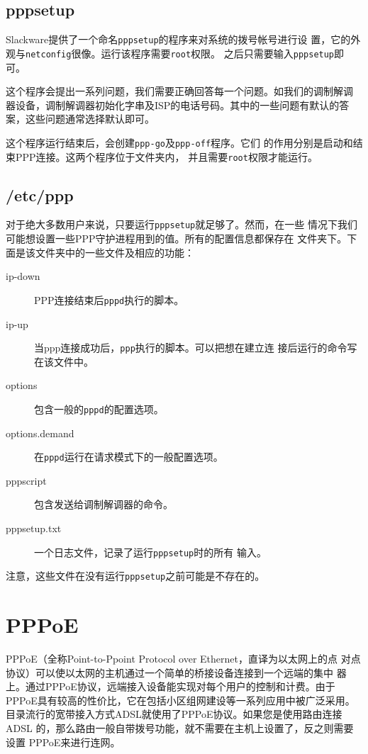 \subsection{pppsetup}
\label{sec:networkConfiguration:ppp:pppsetup}
Slackware提供了一个命名\texttt{pppsetup}的程序来对系统的拨号帐号进行设
置，它的外观与\texttt{netconfig}很像。运行该程序需要\texttt{root}权限。
之后只需要输入\texttt{pppsetup}即可。

这个程序会提出一系列问题，我们需要正确回答每一个问题。如我们的调制解调
器设备，调制解调器初始化字串及ISP的电话号码。其中的一些问题有默认的答
案，这些问题通常选择默认即可。

这个程序运行结束后，会创建\texttt{ppp-go}及\texttt{ppp-off}程序。它们
的作用分别是启动和结束PPP连接。这两个程序位于文件夹内，
并且需要\texttt{root}权限才能运行。

\subsection{/etc/ppp}
\label{sec:networkConfiguration:ppp:ppp}
对于绝大多数用户来说，只要运行\texttt{pppsetup}就足够了。然而，在一些
情况下我们可能想设置一些PPP守护进程用到的值。所有的配置信息都保存在
文件夹下。下面是该文件夹中的一些文件及相应的功能：

\begin{description}
\item[ip-down] PPP连接结束后\texttt{pppd}执行的脚本。
\item[ip-up] 当ppp连接成功后，\texttt{ppp}执行的脚本。可以把想在建立连
  接后运行的命令写在该文件中。
\item[options] 包含一般的\texttt{pppd}的配置选项。
\item[options.demand] 在\texttt{pppd}运行在请求模式下的一般配置选项。
\item[pppscript] 包含发送给调制解调器的命令。
\item[pppsetup.txt] 一个日志文件，记录了运行\texttt{pppsetup}时的所有
  输入。
\end{description}
注意，这些文件在没有运行\texttt{pppsetup}之前可能是不存在的。

\section{PPPoE}
\label{sec:networkConfiguration:pppoe}
PPPoE（全称Point-to-Ppoint Protocol over Ethernet，直译为以太网上的点
对点协议）可以使以太网的主机通过一个简单的桥接设备连接到一个远端的集中
器上。通过PPPoE协议，远端接入设备能实现对每个用户的控制和计费。由于
PPPoE具有较高的性价比，它在包括小区组网建设等一系列应用中被广泛采用。
目录流行的宽带接入方式ADSL就使用了PPPoE协议。如果您是使用路由连接ADSL
的，那么路由一般自带拨号功能，就不需要在主机上设置了，反之则需要设置
PPPoE来进行连网。

